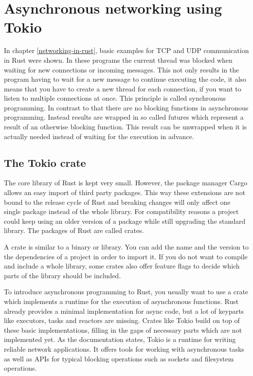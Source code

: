 
\section{Asynchronous networking using Tokio} \label{asynchronous-networking}
In chapter \ref{networking-in-rust}, basic examples for TCP and UDP communication in Rust were shown. In these programs the current
thread was blocked when waiting for new connections or incoming messages. This not only results in the program having
to wait for a new message to continue executing the code, it also means that you have to create a new thread for each
connection, if you want to listen to multiple connections at once. This principle is called synchronous programming. In
contrast to that there are no blocking functions in asynchronous programming. Instead results are wrapped in so called
futures which represent a result of an otherwise blocking function. This result can be unwrapped when it is actually
needed instead of waiting for the execution in advance. \cite{async-rust}

\subsection{The Tokio crate}
The core library of Rust is kept very small. However, the package manager Cargo allows an easy import of third party
packages. This way these extensions are not bound to the release cycle of Rust and breaking changes will only affect
one single package instead of the whole library. For compatibility reasons a project could keep using an older version
of a package while still upgrading the standard library. The packages of Rust are called crates.

A crate is similar to a binary or library. You can add the name and the version to the dependencies of a project in
order to import it. If you do not want to compile and include a whole library, some crates also offer feature flags
to decide which parts of the library should be included.

To introduce asynchronous programming to Rust, you usually want to use a crate which implements a runtime for the
execution of asynchronous functions. Rust already provides a minimal implementation for async code, but a lot of
keyparts like executors, tasks and reactors are missing. Crates like Tokio build on top of these basic implementations,
filling in the gaps of necessary parts which are not implemented yet. As the documentation \cite{tokio-doc} states,
Tokio is a runtime for writing reliable network applications. It offers tools for working with asynchronous tasks as
well as APIs for typical blocking operations such as sockets and filesystem operations.

